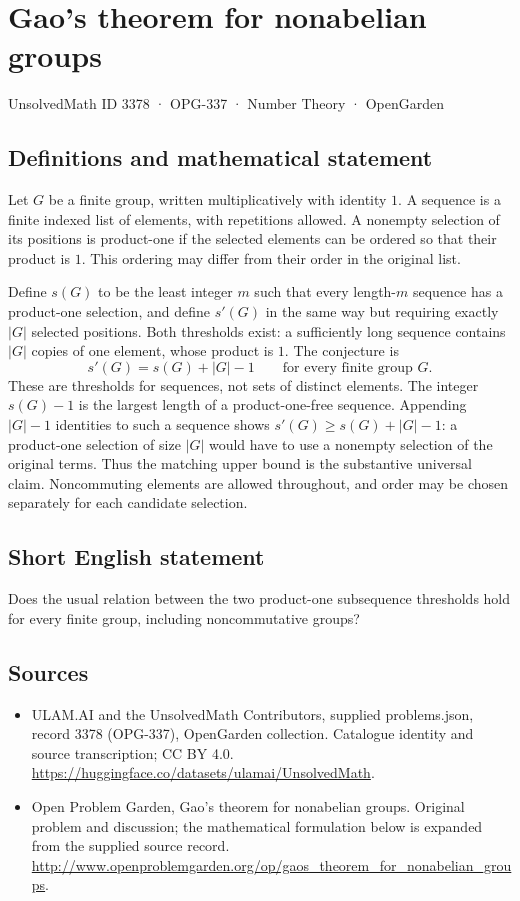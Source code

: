 \documentclass[11pt,a4paper]{article}
\begin{document}
\section*{Gao's theorem for nonabelian groups}\label{3378}
{\small UnsolvedMath ID 3378 · OPG-337 · Number Theory · OpenGarden}
\subsection{Definitions and mathematical statement}
Let $G$ be a finite group, written multiplicatively with identity $1$.
A sequence is a finite indexed list of elements, with repetitions
allowed. A nonempty selection of its positions is product-one if
the selected elements can be ordered so that their product is $1$.
This ordering may differ from their order in the original list.

Define $s(G)$ to be the least integer $m$ such that every length-$m$
sequence has a product-one selection, and define $s'(G)$ in the same
way but requiring exactly $|G|$ selected positions. Both thresholds
exist: a sufficiently long sequence contains $|G|$ copies of one
element, whose product is $1$. The conjecture is
\[
                         s'(G)=s(G)+|G|-1
                   \qquad\text{for every finite group }G.
\]
These are thresholds for sequences, not sets of distinct elements.
The integer $s(G)-1$ is the largest length of a product-one-free
sequence. Appending $|G|-1$ identities to such a sequence shows
$s'(G)\ge s(G)+|G|-1$: a product-one selection of size $|G|$ would
have to use a nonempty selection of the original terms. Thus the
matching upper bound is the substantive universal claim. Noncommuting
elements are allowed throughout, and order may be chosen separately
for each candidate selection.
\subsection{Short English statement}
Does the usual relation between the two product-one subsequence thresholds hold for every finite group, including noncommutative groups?
\subsection{Sources}
\begin{itemize}
\item[S1] ULAM.AI and the UnsolvedMath Contributors, supplied problems.json, record 3378 (OPG-337), OpenGarden collection. Catalogue identity and source transcription; CC BY 4.0.
\url{https://huggingface.co/datasets/ulamai/UnsolvedMath}.
\item[S2] Open Problem Garden, Gao's theorem for nonabelian groups. Original problem and discussion; the mathematical formulation below is expanded from the supplied source record.
\url{http://www.openproblemgarden.org/op/gaos_theorem_for_nonabelian_groups}.
\end{itemize}
\end{document}
